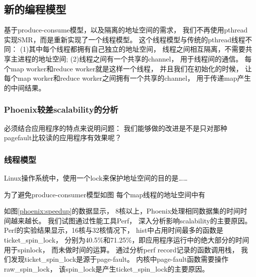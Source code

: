 \subsection{新的编程模型}
基于produce-consume模型，以及隔离的地址空间的需求，
我们不再使用pthread实现SMR，而是重新实现了一个线程模型。
这个线程模型与传统的pthread线程不同：
(1)其中每个线程都拥有自己独立的地址空间，
线程之间相互隔离，不需要共享主进程的地址空间;
(2)线程之间有一个共享的channel，
用于线程间的通信。
每个map worker和reduce worker就是这样一个线程，
并且我们在初始化的时候，
让每个map worker和reduce worker之间拥有一个共享的channel，
用于传递map产生的中间结果。

\subsubsection{Phoenix较差scalability的分析}
必须结合应用程序的特点来说明问题：
我们能够做的改进是不是只对那种pagefault比较读的应用程序有效果呢？
\subsubsection{线程模型}
Linux操作系统中，使用一个lock来保护地址空间的目的是……

为了避免produce-consumer模型如图
每个map线程的地址空间中有




















如图\ref{phoenix:speedup}的数据显示，
8核以上，Phoenix处理相同数据集的时间时间越来越长。
我们试图通过性能工具Perf\cite{}，
深入分析影响scalability的主要原因。
Perf的实验结果显示，16核与32核情况下，
hist中占用时间最多的函数是ticket\_spin\_lock，
分别为40.5\%和71.25\%，即应用程序运行中的绝大部分的时间用于spinlock，
而未做时间的运算。
通过分析perf record记录的函数调用栈，
我们发现ticket\_spin\_lock是源于page-fault。
内核中page-fault函数需要操作raw\_spin\_lock，
该spin\_lock是产生ticket\_spin\_lock的主要原因。

